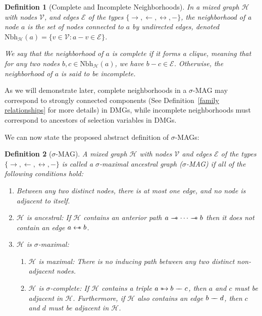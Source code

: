 \documentclass[accepted]{uai2025} %
\newtheorem{definition}{Definition}
\newcommand{\huh}{\mathrel{\leftrightarrow}}
\newcommand{\hus}{\mathrel{{\leftarrow\mkern-11mu\ast}}}
\newcommand{\suh}{\mathrel{{\ast\mkern-11mu\to}}}
\newcommand{\tus}{\mathrel{{\relbar\mkern-11mu\relbar\mkern-11mu\ast}}}
\newcommand{\tut}{\mathrel{{\relbar\mkern-9mu\relbar}}}
\begin{document}
\begin{definition}[Complete and Incomplete Neighborhoods]
In a mixed graph $\mathcal{H}$ with nodes $ \mathcal{V} $, and edges $ \mathcal{E} $ of the types $\{\rightarrow, \leftarrow, \huh , -\}$, the \emph{neighborhood} of a node $a$ is the set of nodes connected to $a$ by undirected edges, denoted \(\text{Nbh}_\mathcal{H}(a) = \{v \in \mathcal{V} : a - v \in \mathcal{E}\}\). 

We say that the neighborhood of \(a\) is \emph{complete} if it forms a clique, meaning that for any two nodes \(b, c \in \text{Nbh}_\mathcal{H}(a)\), we have \(b - c \in \mathcal{E}\). Otherwise, the neighborhood of \(a\) is said to be \emph{incomplete}.
\end{definition}

As we will demonstrate later, complete neighborhoods in a $\sigma$-MAG may correspond to strongly connected components (See Definition~\ref{family relationships} for more details) in DMGs, while incomplete neighborhoods must correspond to ancestors of selection variables in DMGs.

We can now state the proposed abstract definition of $\sigma$-MAGs:

\begin{definition}[\(\sigma\)-MAG]  
A mixed graph \( \mathcal{H} \) with nodes \( \mathcal{V} \) and edges $\mathcal{E}$ of the types \( \{\rightarrow, \leftarrow, \huh , -\} \) is called a \emph{\( \sigma \)-maximal ancestral graph (\(\sigma\)-MAG)} if all of the following conditions hold:  
\begin{enumerate}  
    \item Between any two distinct nodes, there is at most one edge, and no node is adjacent to itself.  
    \item $\mathcal{H}$ is \emph{ancestral}: If \( \mathcal{H} \) contains an anterior path \( a \tus \cdots \tus b \) then it does not contain an edge \( a \hus b \).
    \item $\mathcal{H}$ is \emph{\( \sigma \)-maximal}:
    \begin{enumerate}
        \item $\mathcal{H}$ is \emph{maximal}: There is no inducing path between any two distinct non-adjacent nodes.
        \item \( \mathcal{H} \) is \emph{\(\sigma\)-complete}: If \( \mathcal{H} \) contains a triple \( a \suh b \tut c \), then \( a \) and \( c \) must be adjacent in \( \mathcal{H} \). Furthermore, if \( \mathcal{H} \) also contains an edge \( b \tut d \), then \( c \) and \( d \) must be adjacent in \( \mathcal{H} \).
    \end{enumerate}
\end{enumerate}  
\end{definition}
\end{document}
